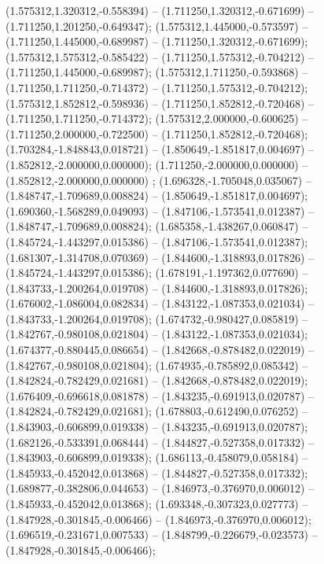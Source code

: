  (1.575312,1.320312,-0.558394) -- (1.711250,1.320312,-0.671699) -- (1.711250,1.201250,-0.649347);
 (1.575312,1.445000,-0.573597) -- (1.711250,1.445000,-0.689987) -- (1.711250,1.320312,-0.671699);
 (1.575312,1.575312,-0.585422) -- (1.711250,1.575312,-0.704212) -- (1.711250,1.445000,-0.689987);
 (1.575312,1.711250,-0.593868) -- (1.711250,1.711250,-0.714372) -- (1.711250,1.575312,-0.704212);
 (1.575312,1.852812,-0.598936) -- (1.711250,1.852812,-0.720468) -- (1.711250,1.711250,-0.714372);
 (1.575312,2.000000,-0.600625) -- (1.711250,2.000000,-0.722500) -- (1.711250,1.852812,-0.720468);
 (1.703284,-1.848843,0.018721) -- (1.850649,-1.851817,0.004697) -- (1.852812,-2.000000,0.000000);
 (1.711250,-2.000000,0.000000) -- (1.852812,-2.000000,0.000000) ;
 (1.696328,-1.705048,0.035067) -- (1.848747,-1.709689,0.008824) -- (1.850649,-1.851817,0.004697);
 (1.690360,-1.568289,0.049093) -- (1.847106,-1.573541,0.012387) -- (1.848747,-1.709689,0.008824);
 (1.685358,-1.438267,0.060847) -- (1.845724,-1.443297,0.015386) -- (1.847106,-1.573541,0.012387);
 (1.681307,-1.314708,0.070369) -- (1.844600,-1.318893,0.017826) -- (1.845724,-1.443297,0.015386);
 (1.678191,-1.197362,0.077690) -- (1.843733,-1.200264,0.019708) -- (1.844600,-1.318893,0.017826);
 (1.676002,-1.086004,0.082834) -- (1.843122,-1.087353,0.021034) -- (1.843733,-1.200264,0.019708);
 (1.674732,-0.980427,0.085819) -- (1.842767,-0.980108,0.021804) -- (1.843122,-1.087353,0.021034);
 (1.674377,-0.880445,0.086654) -- (1.842668,-0.878482,0.022019) -- (1.842767,-0.980108,0.021804);
 (1.674935,-0.785892,0.085342) -- (1.842824,-0.782429,0.021681) -- (1.842668,-0.878482,0.022019);
 (1.676409,-0.696618,0.081878) -- (1.843235,-0.691913,0.020787) -- (1.842824,-0.782429,0.021681);
 (1.678803,-0.612490,0.076252) -- (1.843903,-0.606899,0.019338) -- (1.843235,-0.691913,0.020787);
 (1.682126,-0.533391,0.068444) -- (1.844827,-0.527358,0.017332) -- (1.843903,-0.606899,0.019338);
 (1.686113,-0.458079,0.058184) -- (1.845933,-0.452042,0.013868) -- (1.844827,-0.527358,0.017332);
 (1.689877,-0.382806,0.044653) -- (1.846973,-0.376970,0.006012) -- (1.845933,-0.452042,0.013868);
 (1.693348,-0.307323,0.027773) -- (1.847928,-0.301845,-0.006466) -- (1.846973,-0.376970,0.006012);
 (1.696519,-0.231671,0.007533) -- (1.848799,-0.226679,-0.023573) -- (1.847928,-0.301845,-0.006466);

